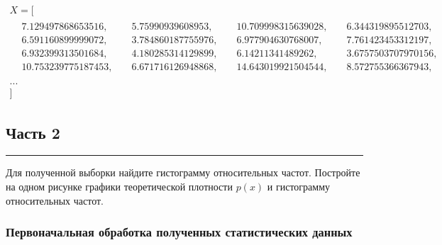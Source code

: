 \documentclass[a4paper, 14pt]{extarticle}
\begin{document}
\noindent
\begin{adjustbox}{max width=1\textwidth}
  \parbox{\linewidth}{%
    \begin{gather*}
      X = [ \\
      \begin{aligned}
        & 7.129497868653516,  & \hspace{3pt} & 5.75990939608953,  & \hspace{3pt} & 10.709998315639028, & \hspace{3pt} & 6.344319895512703, & \\
        & 6.591160899999072,  & \hspace{3pt} & 3.784860187755976, & \hspace{3pt} & 6.977904630768007,  & \hspace{3pt} & 7.761423453312197, & \\
        & 6.932399313501684,  & \hspace{3pt} & 4.180285314129899, & \hspace{3pt} & 6.14211341489262,   & \hspace{3pt} & 3.6757503707970156,& \\ 
        & 10.753239775187453, & \hspace{3pt} & 6.671716126948868, & \hspace{3pt} & 14.643019921504544, & \hspace{3pt} & 8.572755366367943, & \\ 
      \end{aligned} \\
      ...\\
      ]
    \end{gather*}
  }
\end{adjustbox}

\subsection{Часть 2}\vspace{-20pt}\rule{\linewidth}{0.1mm}

Для полученной выборки найдите гистограмму относительных частот. 
Постройте на одном рисунке графики теоретической плотности $p(x)$ и 
гистограмму относительных частот.

\subsubsection{Первоначальная обработка полученных статистических данных}
\end{document}
